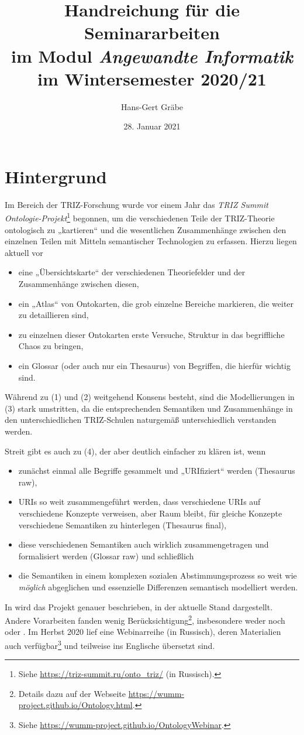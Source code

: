 \documentclass[11pt,a4paper]{article}
\title{Handreichung für die Seminararbeiten\\ im Modul \emph{Angewandte
    Informatik}\\ im Wintersemester 2020/21}
\author{Hans-Gert Gr\"abe}
\date{28. Januar 2021}
\begin{document}
\maketitle

\section{Hintergrund}

Im Bereich der TRIZ-Forschung wurde vor einem Jahr das \emph{TRIZ Summit
  Ontologie-Projekt}\footnote{Siehe \url{https://triz-summit.ru/onto_triz/}
  (in Russisch).}  begonnen, um die verschiedenen Teile der TRIZ-Theorie
ontologisch zu „kartieren“ und die wesentlichen Zusammenhänge zwischen den
einzelnen Teilen mit Mitteln semantischer Technologien zu erfassen. Hierzu
liegen aktuell vor
\begin{itemize}[noitemsep]
\item[(1)] eine „Übersichtskarte“ der verschiedenen Theoriefelder und der
  Zusammenhänge zwischen diesen,
\item[(2)] ein „Atlas“ von Ontokarten, die grob einzelne Bereiche markieren,
  die weiter zu detaillieren sind,
\item[(3)] zu einzelnen dieser Ontokarten erste Versuche, Struktur in das
  begriff\-liche Chaos zu bringen,
\item[(4)] ein Glossar (oder auch nur ein Thesaurus) von Begriffen, die
  hierfür wichtig sind.
\end{itemize}

Während zu (1) und (2) weitgehend Konsens besteht, sind die Modellierungen in
(3) stark umstritten, da die entsprechenden Semantiken und Zusammenhänge in
den unterschiedlichen TRIZ-Schulen naturgemäß unterschiedlich verstanden
werden.

Streit gibt es auch zu (4), der aber deutlich einfacher zu klären ist, wenn 
\begin{itemize}[noitemsep]
\item[(4a)] zunächst einmal alle Begriffe gesammelt und „URIfiziert“ werden
  (Thesaurus raw),
\item[(4b)] URIs so weit zusammengeführt werden, dass verschiedene URIs auf
  verschiedene Konzepte verweisen, aber Raum bleibt, für gleiche Konzepte
  verschiedene Semantiken zu hinterlegen (Thesaurus final),
\item[(4c)] diese verschiedenen Semantiken auch wirklich zusammengetragen und
  formalisiert werden (Glossar raw) und schließlich
\item[(4d)] die Semantiken in einem komplexen sozialen Abstimmungsprozess so
  weit wie \emph{möglich} abgeglichen und essenzielle Differenzen semantisch
  modelliert werden. 
\end{itemize}
In \cite{Kuryan2019} wird das Projekt genauer beschrieben, in
\cite{Kuryan2020} der aktuelle Stand dargestellt. Andere Vorarbeiten fanden
wenig Berücksichtigung\footnote{Details dazu auf der Webseite
  \url{https://wumm-project.github.io/Ontology.html}.}, insbesondere weder
\cite{IDM2011} noch \cite{GSA} oder \cite{VDI}. Im Herbst 2020 lief eine
Webinarreihe (in Russisch), deren Materialien auch verfügbar\footnote{Siehe
  \url{https://wumm-project.github.io/OntologyWebinar}.} und teilweise ins
Englische übersetzt sind.
\end{document}
